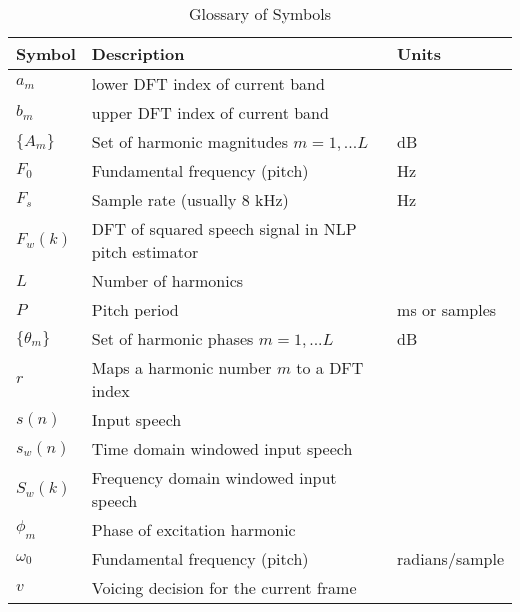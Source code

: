\documentclass{article}
\begin{document}
\begin{table}[H]
\label{tab:symbol_glossary}
\centering
\begin{tabular}{l l l }
\hline
Symbol & Description & Units \\
\hline
$a_m$ & lower DFT index of current band \\
$b_m$ & upper DFT index of current band \\
$\{A_m\}$ & Set of harmonic magnitudes $m=1,...L$ & dB \\
$F_0$ & Fundamental frequency (pitch) & Hz \\
$F_s$ & Sample rate (usually 8 kHz) & Hz \\
$F_w(k)$ & DFT of squared speech signal in NLP pitch estimator \\
$L$ & Number of harmonics \\
$P$ & Pitch period & ms or samples \\
$\{\theta_m\}$ & Set of harmonic phases $m=1,...L$ & dB \\
$r$ & Maps a harmonic number $m$ to a DFT index \\
$s(n)$ & Input speech \\
$s_w(n)$ & Time domain windowed input speech \\
$S_w(k)$ & Frequency domain windowed input speech \\
$\phi_m$ & Phase of excitation harmonic \\
$\omega_0$ & Fundamental frequency (pitch) & radians/sample \\
$v$ & Voicing decision for the current frame \\
\hline
\end{tabular}
\caption{Glossary of Symbols}
\end{table}



\end{document}
